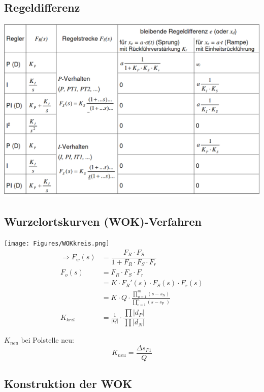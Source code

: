 

\subsection{Regeldifferenz}
\includegraphics[width=0.98\columnwidth]{Figures/Reglerauswahl.png}

\newpage
\subsection{Wurzelortskurven (WOK)-Verfahren}

\texttt{[image: Figures/WOKkreis.png]}
\begin{align*}
	\Rightarrow F_w (s) &= \dfrac {F_R \cdot F_S} {1+F_R \cdot F_S \cdot F_r} \\
				F_o(s) 	&= F_R \cdot F_S \cdot F_r \\
						& =K \cdot F_R '(s) \cdot F_S (s) \cdot F_r (s) \\
						& =K \cdot Q \cdot \frac{\prod_{u=1}^{m}\left(s-s_{\text {N}}\right)}{\prod_{v=1}^{n}\left(s-s_{\text {P }}\right)} \\
	K_{krit} 			&= \frac{1}{|Q|} \cdot \dfrac{\prod |d_{P}|}{\prod |d_{N}|}
\end{align*}

$K_{neu}$ bei Polstelle neu:
\[ K_{neu} = \frac{ \Delta s_{P1}}{Q} \]

\subsection{Konstruktion der WOK}

